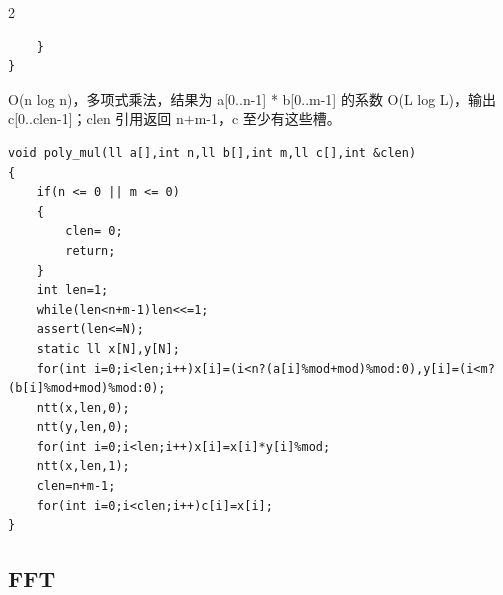 \documentclass[UTF8,fontset=fandol,a4paper,twoside]{ctexart}
\newcommand{\note}[1]{{\fontsize{10}{12}\selectfont #1\par}}
\begin{document}
\begin{multicols}{2}
\begin{lstlisting}
    }
}
\end{lstlisting}
\note{O(\allowbreak{}n log n)\allowbreak{}，多项式乘法，结果为 a[\allowbreak{}0.\allowbreak{}.\allowbreak{}n-\allowbreak{}1]\allowbreak{} * b[\allowbreak{}0.\allowbreak{}.\allowbreak{}m-\allowbreak{}1]\allowbreak{} 的系数 O(\allowbreak{}L log L)\allowbreak{}，输出 c[\allowbreak{}0.\allowbreak{}.\allowbreak{}clen-\allowbreak{}1]\allowbreak{}；clen 引用返回 n+\allowbreak{}m-\allowbreak{}1，c 至少有这些槽。}
\begin{lstlisting}
void poly_mul(ll a[],int n,ll b[],int m,ll c[],int &clen)
{
    if(n <= 0 || m <= 0)
    {
        clen= 0;
        return;
    }
    int len=1;
    while(len<n+m-1)len<<=1;
    assert(len<=N);
    static ll x[N],y[N];
    for(int i=0;i<len;i++)x[i]=(i<n?(a[i]%mod+mod)%mod:0),y[i]=(i<m?(b[i]%mod+mod)%mod:0);
    ntt(x,len,0);
    ntt(y,len,0);
    for(int i=0;i<len;i++)x[i]=x[i]*y[i]%mod;
    ntt(x,len,1);
    clen=n+m-1;
    for(int i=0;i<clen;i++)c[i]=x[i];
}
\end{lstlisting}
\subsection{FFT}


\end{multicols}
\end{document}
